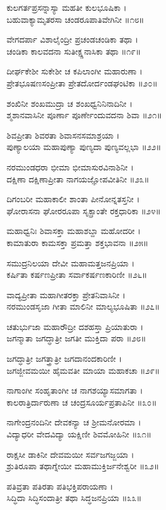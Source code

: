 ಕುಲಗರ್ತಪ್ರಸನ್ನಾಸ್ಯಾ ಮಹತೀ ಕುಲಭೂಷಿಕಾ ।\\
ಬಹುವಾಕ್ಯಾಮೃತರಸಾ ಚಂಡರೂಪಾತಿವೇಗಿನೀ ॥೧೮॥

ವೇಗದರ್ಪಾ ವಿಶಾಲೈಂದ್ರೀ ಪ್ರಚಂಡಚಂಡಿಕಾ ತಥಾ ।\\
ಚಂಡಿಕಾ ಕಾಲವದನಾ ಸುತೀಕ್ಷ್ಣನಾಸಿಕಾ ತಥಾ ॥೧೯॥

ದೀರ್ಘಕೇಶೀ ಸುಕೇಶೀ ಚ ಕಪಿಲಾಂಗೀ ಮಹಾರುಣಾ ।\\
ಪ್ರೇತಭೂಷಣಸಂಪ್ರೀತಾ ಪ್ರೇತದೋರ್ದಂಡಘಂಟಿಕಾ ॥೨೦॥

ಶಂಖಿನೀ ಶಂಖಮುದ್ರಾ ಚ ಶಂಖಧ್ವನಿನಿನಾದಿನೀ ।\\
ಶ್ಮಶಾನವಾಸಿನೀ ಪೂರ್ಣಾ ಪೂರ್ಣೇಂದುವದನಾ ಶಿವಾ ॥೨೧॥

ಶಿವಪ್ರೀತಾ ಶಿವರತಾ ಶಿವಾಸನಸಮಾಶ್ರಯಾ ।\\
ಪುಣ್ಯಾಲಯಾ ಮಹಾಪುಣ್ಯಾ ಪುಣ್ಯದಾ ಪುಣ್ಯವಲ್ಲಭಾ ॥೨೨॥

ನರಮುಂಡಧರಾ ಭೀಮಾ ಭೀಮಾಸುರವಿನಾಶಿನೀ ।\\
ದಕ್ಷಿಣಾ ದಕ್ಷಿಣಾಪ್ರೀತಾ ನಾಗಯಜ್ಞೋಪವೀತಿನೀ ॥೨೩॥

ದಿಗಂಬರೀ ಮಹಾಕಾಲೀ ಶಾಂತಾ ಪೀನೋನ್ನತಸ್ತನೀ ।\\
ಘೋರಾಸನಾ ಘೋರರೂಪಾ ಸೃಕ್ಪ್ರಾಂತೇ ರಕ್ತಧಾರಿಕಾ ॥೨೪॥

ಮಹಾಧ್ವನಿಃ ಶಿವಾಸಕ್ತಾ ಮಹಾಶಬ್ದಾ ಮಹೋದರೀ ।\\
ಕಾಮಾತುರಾ ಕಾಮಸಕ್ತಾ ಪ್ರಮತ್ತಾ ಶಕ್ತಭಾವನಾ ॥೨೫॥

ಸಮುದ್ರನಿಲಯಾ ದೇವೀ ಮಹಾಮತ್ತಜನಪ್ರಿಯಾ ।\\
ಕರ್ಷಿತಾ ಕರ್ಷಣಪ್ರೀತಾ ಸರ್ವಾಕರ್ಷಣಕಾರಿಣೀ ॥೨೬॥

ವಾದ್ಯಪ್ರೀತಾ ಮಹಾಗೀತರಕ್ತಾ ಪ್ರೇತನಿವಾಸಿನೀ ।\\
ನರಮುಂಡಸೃಜಾ ಗೀತಾ ಮಾಲಿನೀ ಮಾಲ್ಯಭೂಷಿತಾ ॥೨೭॥

ಚತುರ್ಭುಜಾ ಮಹಾರೌದ್ರೀ ದಶಹಸ್ತಾ ಪ್ರಿಯಾತುರಾ ।\\
ಜಗನ್ಮಾತಾ ಜಗದ್ಧಾತ್ರೀ ಜಗತೀ ಮುಕ್ತಿದಾ ಪರಾ ॥೨೮॥

ಜಗದ್ಧಾತ್ರೀ ಜಗತ್ತ್ರಾತ್ರೀ ಜಗದಾನಂದಕಾರಿಣೀ ।\\
ಜಗಜ್ಜೀವಮಯೀ ಹೈಮವತೀ ಮಾಯಾ ಮಹಾಕಚಾ ॥೨೯॥

ನಾಗಾಂಗೀ ಸಂಹೃತಾಂಗೀ ಚ ನಾಗಶಯ್ಯಾಸಮಾಗತಾ ।\\
ಕಾಲರಾತ್ರಿರ್ದಾರುಣಾ ಚ ಚಂದ್ರಸೂರ್ಯಪ್ರತಾಪಿನೀ ॥೩೦॥

ನಾಗೇಂದ್ರನಂದಿನೀ ದೇವಕನ್ಯಾ ಚ ಶ್ರೀಮನೋರಮಾ ।\\
ವಿದ್ಯಾಧರೀ ವೇದವಿದ್ಯಾ ಯಕ್ಷಿಣೀ ಶಿವಮೋಹಿನೀ ॥೩೧॥

ರಾಕ್ಷಸೀ ಡಾಕಿನೀ ದೇವಮಯೀ ಸರ್ವಜಗಜ್ಜಯಾ ।\\
ಶ್ರುತಿರೂಪಾ ತಥಾಗ್ನೇಯೀ ಮಹಾಮುಕ್ತಿರ್ಜನೇಶ್ವರೀ ॥೩೨॥

ಪತಿವ್ರತಾ ಪತಿರತಾ ಪತಿಭಕ್ತಿಪರಾಯಣಾ ।\\
ಸಿದ್ಧಿದಾ ಸಿದ್ಧಿಸಂದಾತ್ರೀ ತಥಾ ಸಿದ್ಧಜನಪ್ರಿಯಾ ॥೩೩॥

